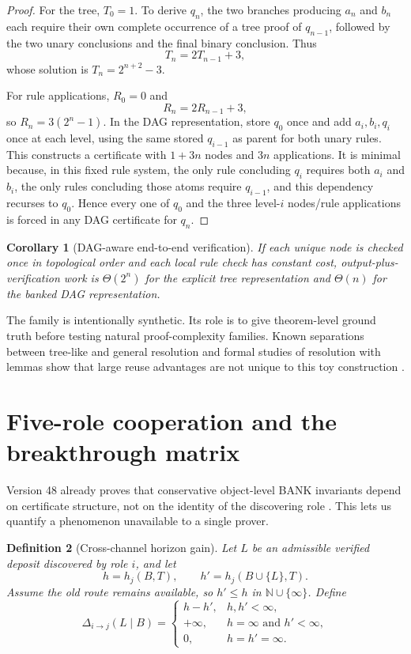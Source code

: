 \documentclass[11pt]{article}
\newtheorem{definition}{Definition}[section]
\newtheorem{corollary}[definition]{Corollary}
\theoremstyle{remark}
\newcommand{\N}{\mathbb N}
\begin{document}
\begin{proof}
For the tree, $T_0=1$. To derive $q_n$, the two branches producing $a_n$ and $b_n$ each require their own complete occurrence of a tree proof of $q_{n-1}$, followed by the two unary conclusions and the final binary conclusion. Thus
\[
T_n=2T_{n-1}+3,
\]
whose solution is $T_n=2^{n+2}-3$.

For rule applications, $R_0=0$ and
\[
R_n=2R_{n-1}+3,
\]
so $R_n=3(2^n-1)$. In the DAG representation, store $q_0$ once and add $a_i,b_i,q_i$ once at each level, using the same stored $q_{i-1}$ as parent for both unary rules. This constructs a certificate with $1+3n$ nodes and $3n$ applications. It is minimal because, in this fixed rule system, the only rule concluding $q_i$ requires both $a_i$ and $b_i$, the only rules concluding those atoms require $q_{i-1}$, and this dependency recurses to $q_0$. Hence every one of $q_0$ and the three level-$i$ nodes/rule applications is forced in any DAG certificate for $q_n$.
\end{proof}

\begin{corollary}[DAG-aware end-to-end verification]
If each unique node is checked once in topological order and each local rule check has constant cost, output-plus-verification work is $\Theta(2^n)$ for the explicit tree representation and $\Theta(n)$ for the banked DAG representation.
\end{corollary}

The family is intentionally synthetic. Its role is to give theorem-level ground truth before testing natural proof-complexity families. Known separations between tree-like and general resolution and formal studies of resolution with lemmas show that large reuse advantages are not unique to this toy construction \cite{biw,bks,bhj}.

\section{Five-role cooperation and the breakthrough matrix}

Version 48 already proves that conservative object-level BANK invariants depend on certificate structure, not on the identity of the discovering role \cite{depths48}. This lets us quantify a phenomenon unavailable to a single prover.

\begin{definition}[Cross-channel horizon gain]
Let $L$ be an admissible verified deposit discovered by role $i$, and let
\[
h=h_j(B,T),\qquad h'=h_j(B\cup\{L\},T).
\]
Assume the old route remains available, so $h'\le h$ in $\N\cup\{\infty\}$. Define
\[
\Delta_{i\to j}(L\mid B)=
\begin{cases}
h-h', & h,h'<\infty,\\
+\infty, & h=\infty\text{ and }h'<\infty,\\
0, & h=h'=\infty.
\end{cases}
\]
\end{definition}
\end{document}
